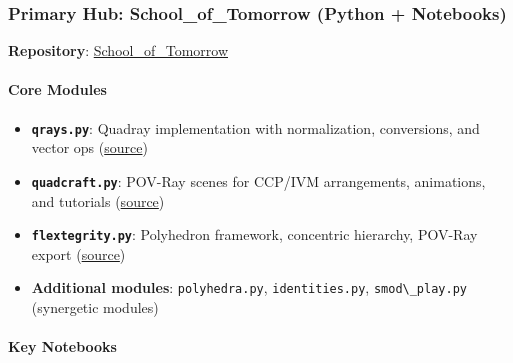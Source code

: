 \documentclass[
  10pt,
]{article}
\newcommand{\passthrough}[1]{#1}
\providecommand{\tightlist}{%
  \setlength{\itemsep}{0pt}\setlength{\parskip}{0pt}}
\begin{document}
\subsubsection{Primary Hub: School\_of\_Tomorrow (Python +
Notebooks)}\label{primary-hub-school_of_tomorrow-python-notebooks}

\textbf{Repository}:
\href{https://github.com/4dsolutions/School_of_Tomorrow}{School\_of\_Tomorrow}

\paragraph{Core Modules}\label{core-modules}

\begin{itemize}
\tightlist
\item
  \textbf{\passthrough{\lstinline!qrays.py!}}: Quadray implementation
  with normalization, conversions, and vector ops
  (\href{https://github.com/4dsolutions/School_of_Tomorrow/blob/master/qrays.py}{source})
\item
  \textbf{\passthrough{\lstinline!quadcraft.py!}}: POV-Ray scenes for
  CCP/IVM arrangements, animations, and tutorials
  (\href{https://github.com/4dsolutions/School_of_Tomorrow/blob/master/quadcraft.py}{source})
\item
  \textbf{\passthrough{\lstinline!flextegrity.py!}}: Polyhedron
  framework, concentric hierarchy, POV-Ray export
  (\href{https://github.com/4dsolutions/School_of_Tomorrow/blob/master/flextegrity.py}{source})
\item
  \textbf{Additional modules}: \passthrough{\lstinline!polyhedra.py!},
  \passthrough{\lstinline!identities.py!},
  \passthrough{\lstinline!smod\_play.py!} (synergetic modules)
\end{itemize}

\paragraph{Key Notebooks}\label{key-notebooks}
\end{document}
